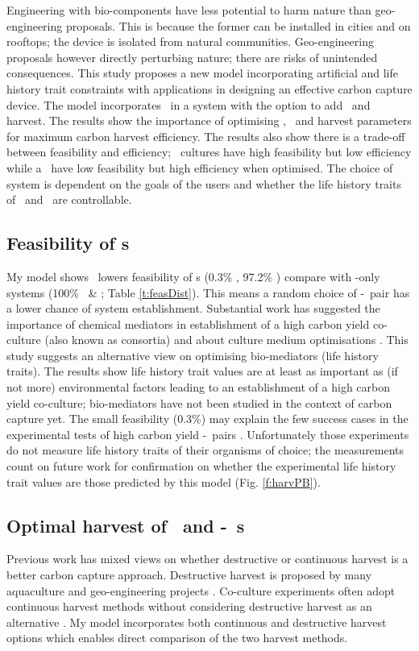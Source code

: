 \documentclass[../thesis.tex]{subfiles} %
\begin{document}
Engineering with bio-components have less potential to harm nature than geo-engineering proposals.  This is because the former can be installed in cities and on rooftops; the device is isolated from natural communities.  Geo-engineering proposals however directly perturbing nature; there are risks of unintended consequences.  This study proposes a new model incorporating artificial and life history trait constraints with applications in designing an effective carbon capture device.  The model incorporates \phy\ in a system with the option to add \bac\ and harvest.  The results show the importance of optimising \phy, \bac\ and harvest parameters for maximum carbon harvest efficiency.  The results also show there is a trade-off between feasibility and efficiency; \phy\ cultures have high feasibility but low efficiency while a \pbs\ have low feasibility but high efficiency when optimised.  The choice of system is dependent on the goals of the users and whether the life history traits of \phy\ and \bac\ are controllable.

\subsection{Feasibility of \pbs s}
My model shows \bac\ lowers feasibility of \pbs s (0.3\% \PBH, 97.2\% \PBN) compare with \phy-only systems (100\% \PoH\ \& \PoN; Table \ref{t:feasDist}).  This means a random choice of \phy-\bac\ pair has a lower chance of system establishment.  Substantial work has suggested the importance of chemical mediators in establishment of a high carbon yield co-culture (also known as consortia) and about culture medium optimisations \autocite{rivas2010interactions,amin2009photolysis,fuentes2016impact}.  This study suggests an alternative view on optimising bio-mediators (life history traits).  The results show life history trait values are at least as important as (if not more) environmental factors leading to an establishment of a high carbon yield co-culture; bio-mediators have not been studied in the context of carbon capture yet.  The small feasibility (0.3\%) may explain the few success cases in the experimental tests of high carbon yield \phy-\bac\ pairs \autocite{fuentes2016impact}.  Unfortunately those experiments do not measure life history traits of their organisms of choice; the measurements count on future work for confirmation on whether the experimental life history trait values are those predicted by this model (Fig. \ref{f:harvPB}).

\subsection{Optimal harvest of \phy\ and \phy-\bac\ \pbs s}
Previous work has mixed views on whether destructive or continuous harvest is a better carbon capture approach.  Destructive harvest is proposed by many aquaculture and geo-engineering projects \autocite{lawrence2014efficiency,krause2016substantial}.  Co-culture experiments often adopt continuous harvest methods without considering destructive harvest as an alternative \autocite{kim2008anaerobic,kazamia2012mutualistic}.  My model incorporates both continuous and destructive harvest options which enables direct comparison of the two harvest methods.
\end{document}
